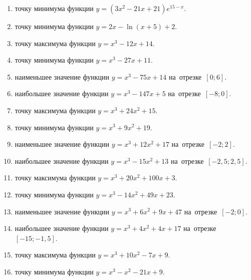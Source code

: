 \documentclass[a4paper,10pt]{article}
\begin{document}
\begin{enumerate}
\item {} точку минимума функции $y=\left(3x^2-21x+21\right){{e}^{15-x}}$.

\item {} точку минимума функции $y=2x-\ln \left(x+5\right)+2$.

\item {} точку максимума функции $y=x^3 -12x +14$.

\item {} точку минимума функции $y=x^3 -27x+11$.

\item {} наименьшее значение функции $y=x^3 -75x+14$ на~отрезке~$\left[0;6\right]$.

\item {} наибольшее значение функции $y=x^3 -147x+5$ на~отрезке~$\left[-8;0\right]$.

\item {} точку максимума функции $y=x^3 +24x^2+15$.

\item {} точку минимума функции $y=x^3 +9x^2+19$.

\item {} наименьшее значение функции $y=x^3 +12x^2+17$ на~отрезке~$\left[-2;2\right]$.

\item {} наибольшее значение функции $y=x^3 -15x^2+13$ на~отрезке~$\left[-2,5;2,5\right]$.

\item {} точку максимума функции $y=x^3 +20x^2+100x+3$.

\item {} точку минимума функции $y=x^3 -14x^2+49x+23$.

\item {} наименьшее значение функции $y=x^3 +6x^2+9x+47$ на~отрезке~$\left[-2;0\right]$.

\item {} наибольшее значение функции $y=x^3 +4x^2+4x+17$ на~отрезке~$\left[-15;-1,5\right]$.

\item {} точку максимума функции $y=x^3 +10x^2-7x+9$.

\item {} точку минимума функции $y=x^3 -x^2-21x+9$.


\end{enumerate}
\end{document}
